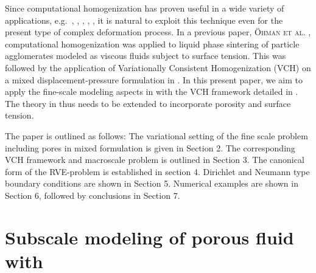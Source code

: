 \documentclass[12pt,a4paper]{article}
\begin{document}
Since computational homogenization has proven useful in a wide variety of applications, e.g.\ \cite{klinge_application_2012}, \cite{miehe_computational_2002}, \cite{oskay_eigendeformation-based_2007}, \cite{sandstrom_variationally_2012}, \cite{zohdi_model_2001}, it is natural to exploit this technique even for the present type of complex deformation process. 
%
%
In a previous paper, \textsc{\"Ohman et al.} \cite{ohman_computational_2013}, computational homogenization was applied to liquid phase sintering of particle agglomerates modeled as viscous fluids subject to surface tension.
This was followed by the application of Variationally Consistent Homogenization (VCH) on a mixed displacement-pressure formulation in \cite{ohman_variationally_2014}.
In this present paper, we aim to apply the fine-scale modeling aspects in \cite{ohman_computational_2013} with the VCH framework detailed in \cite{ohman_variationally_2014}.
The theory in \cite{ohman_variationally_2014} thus needs to be extended to incorporate porosity and surface tension.




% 

The paper is outlined as follows:
The variational setting of the fine scale problem including pores in mixed formulation is given in Section 2.
The corresponding VCH framework and macroscale problem is outlined in Section 3.
The canonical form of the RVE-problem is established in section 4.
Dirichlet and Neumann type boundary conditions are shown in Section 5.
Numerical examples are shown in Section 6, followed by conclusions in Section 7.

\section{Subscale modeling of porous fluid with }
\end{document}
